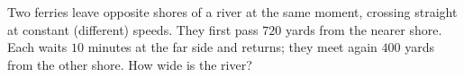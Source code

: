 Two ferries leave opposite shores of a river at the same moment, crossing straight at constant (different) speeds. They first pass $720$ yards from the nearer shore. Each waits $10$ minutes at the far side and returns; they meet again $400$ yards from the other shore. How wide is the river?
